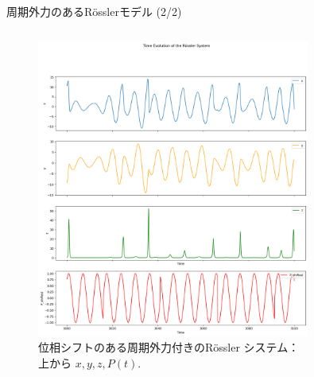 \begin{frame}{周期外力のあるRösslerモデル (2/2)}
\begin{columns}[T]
\begin{column}{.5\textwidth}
\begin{figure}
                \includegraphics[width=0.8\textwidth]{Fig/NEWrossler_waves.png}
                \caption{\scriptsize{位相シフトのある周期外力付きのRössler システム：\\
                上から $x, y, z, P(t)$. }}
            \end{figure}
        \end{column}
      \end{columns}
    
\end{frame}



